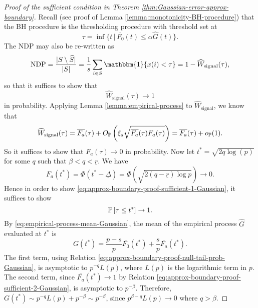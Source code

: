 \begin{proof}[Proof of the sufficient condition in Theorem \ref{thm:Gaussian-error-approx-boundary}]
Recall (see proof of Lemma \ref{lemma:monotonicity-BH-procedure}) that the BH procedure is the thresholding procedure with threshold set at 
\begin{equation} \label{eq:approx-boundary-proof-tau-Gaussian}
    \tau = \inf\{t\,|\,\overline{F_0}(t)\le\alpha\widehat{G}(t)\}. 
\end{equation}
The NDP may also be re-written as 
$$
\text{NDP} = \frac{|{S}\setminus\widehat{S}|}{|{S}|} = \frac{1}{s}\sum_{i\in S}\mathbbm{1}\{x(i) < \tau\} = 1 - \widehat{W}_\text{signal}(\tau),
$$
so that it suffices to show that 
\begin{equation} \label{eq:approx-boundary-proof-sufficient-1-Gaussian}
    \widehat{W}_\text{signal}(\tau)\to 1
\end{equation} in probability.
Applying Lemma \ref{lemma:empirical-process} to $\widehat{W}_\text{signal}$, we know that 
$$
\widehat{W}_\text{signal}(\tau) = \overline{F_a}(\tau) + O_\P\left(\xi_s\sqrt{\overline{F_a}(\tau)F_a(\tau)}\right) = \overline{F_a}(\tau) + o_\P(1).
$$
So it suffices to show that $F_a(\tau)\to 0$ in probability.
Now let $t^* = \sqrt{2q\log(p)}$ for some $q$ such that $\beta<q<\underline{r}$.
We have 
\begin{equation} \label{eq:approx-boundary-proof-sufficient-2-Gaussian}
    F_a(t^*) 
    = \Phi(t^* - \underline{\Delta}) 
    = \Phi(\sqrt{2(q - \underline{r})\log{p}}) \to 0. 
\end{equation}
Hence in order to show \eqref{eq:approx-boundary-proof-sufficient-1-Gaussian}, it suffices to show 
\begin{equation} \label{eq:approx-boundary-proof-sufficient-3-Gaussian}
    \P\left[\tau \le t^*\right] \to 1.
\end{equation}
By \eqref{eq:empirical-process-mean-Gaussian}, the mean of the empirical process $\widehat{G}$ evaluated at $t^*$ is
\begin{equation} \label{eq:approx-boundary-proof-sufficient-4-Gaussian}
    G(t^*) = \frac{p-s}{p}\overline{F_0}(t^*) + \frac{s}{p}\overline{F_a}(t^*).
\end{equation}
The first term, using Relation \eqref{eq:approx-boundary-proof-null-tail-prob-Gaussian}, is asymptotic to $p^{-q}L(p)$, where $L(p)$ is the logarithmic term in $p$.
The second term, since $\overline{F_a}(t^*)\to 1$ by Relation \eqref{eq:approx-boundary-proof-sufficient-2-Gaussian}, is asymptotic to $p^{-\beta}$.
Therefore, $G(t^*) \sim p^{-q}L(p) + p^{-\beta} \sim p^{-\beta}$, since 
$p^{\beta-q}L(p)\to0$ where $q>\beta$.


\end{proof}
